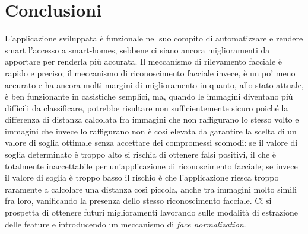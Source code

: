 \chapter{Conclusioni}
L'applicazione sviluppata è funzionale nel suo compito di automatizzare e rendere smart l'accesso a smart-homes, sebbene ci siano ancora miglioramenti da apportare per renderla più accurata. Il meccanismo di rilevamento facciale è rapido e preciso; il meccanismo di riconoscimento facciale invece, è un po' meno accurato e ha ancora molti margini di miglioramento in quanto, allo stato attuale, è ben funzionante in casistiche semplici, ma, quando le immagini diventano più difficili da classificare, potrebbe risultare non sufficientemente sicuro poiché la differenza di distanza calcolata fra immagini che non raffigurano lo stesso volto e immagini che invece lo raffigurano non è così elevata da garantire la scelta di un valore di soglia ottimale senza accettare dei compromessi scomodi: se il valore di soglia determinato è troppo alto si rischia di ottenere falsi positivi, il che è totalmente inaccettabile per un'applicazione di riconoscimento facciale; se invece il valore di soglia è troppo basso il rischio è che l'applicazione riesca troppo raramente a calcolare una distanza così piccola, anche tra immagini molto simili fra loro, vanificando la presenza dello stesso riconoscimento facciale. Ci si prospetta di ottenere futuri miglioramenti lavorando sulle modalità  di estrazione delle feature e introducendo un meccanismo di \textit{face normalization}.